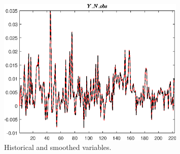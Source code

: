  
\begin{figure}[H]
\centering 
\includegraphics[width=0.80\textwidth]{BRS_growth_KPR_D/graphs/BRS_growth_KPR_D_HistoricalAndSmoothedVariables1}
\caption{Historical and smoothed variables.}\label{Fig:HistoricalAndSmoothedVariables:1}
\end{figure}


